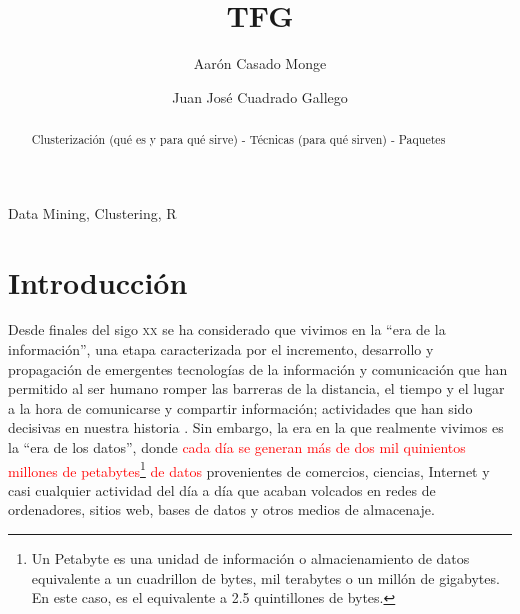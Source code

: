 \documentclass[3p,twocolumn]{elsarticle}
\begin{document}
\title{TFG} %

\author[1]{Aarón Casado Monge} %

\author[2]{Juan José Cuadrado Gallego} %

\address{University of Alcala, Polytechnic School, Computer Science Department, Scientific and Technological Campus, Politechnic Building. Office: O243, 28805, Alcala de Henares, Madrid, Spain}

\begin{abstract}
Clusterización (qué es y para qué sirve) - Técnicas (para qué sirven) - Paquetes 
\end{abstract}

\begin{keyword}
Data Mining, Clustering, R
\end{keyword}

\maketitle %
 
 

 
\section{Introducción}


Desde finales del sigo \textsc{xx} se ha considerado que vivimos en la ``era de la información'', una etapa caracterizada por el incremento, desarrollo y propagación de emergentes tecnologías de la información y comunicación que han permitido al ser humano romper las barreras de la distancia, el tiempo y el lugar a la hora de comunicarse y compartir información; actividades que han sido decisivas en nuestra historia \cite{1}. Sin embargo, la era en la que realmente vivimos es la ``era de los datos'', donde \textcolor{Red} {cada día se generan más de dos mil quinientos millones de petabytes\footnote {Un Petabyte es una unidad de información o almacienamiento de datos equivalente a un cuadrillon de bytes, mil terabytes o un millón de gigabytes. En este caso, es el equivalente a 2.5 quintillones de bytes.} de datos} provenientes de comercios, ciencias, Internet y casi cualquier actividad del día a día \cite{2} que acaban volcados en redes de ordenadores, sitios web, bases de datos y otros medios de almacenaje. 
\end{document}
